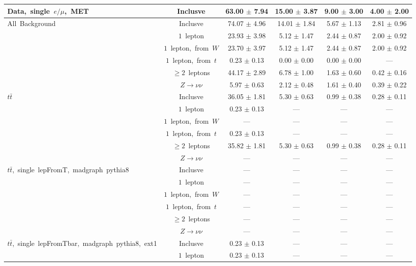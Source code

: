 \documentclass{article}
\begin{document}
\begin{longtable}{|l|c|c|c|c|c|}
\multirow{1}{*}{Data,~single~$e/\mu$,~MET} & Inclusve  & 63.00 $\pm$ 7.94  & 15.00 $\pm$ 3.87  & 9.00 $\pm$ 3.00  & 4.00 $\pm$ 2.00 \\* 
\hline \hline 
\multirow{6}{*}{All~Background} & Inclusve  & 74.07 $\pm$ 4.96  & 14.01 $\pm$ 1.84  & 5.67 $\pm$ 1.13  & 2.81 $\pm$ 0.96 \\* 
 & $1$~lepton  & 23.93 $\pm$ 3.98  & 5.12 $\pm$ 1.47  & 2.44 $\pm$ 0.87  & 2.00 $\pm$ 0.92 \\* 
 & $1$~lepton,~from~$W$  & 23.70 $\pm$ 3.97  & 5.12 $\pm$ 1.47  & 2.44 $\pm$ 0.87  & 2.00 $\pm$ 0.92 \\* 
 & $1$~lepton,~from~$t$  & 0.23 $\pm$ 0.13  & 0.00 $\pm$ 0.00  & 0.00 $\pm$ 0.00  & --- \\* 
 & $\ge2$~leptons  & 44.17 $\pm$ 2.89  & 6.78 $\pm$ 1.00  & 1.63 $\pm$ 0.60  & 0.42 $\pm$ 0.16 \\* 
 & $Z\rightarrow\nu\nu$  & 5.97 $\pm$ 0.63  & 2.12 $\pm$ 0.48  & 1.61 $\pm$ 0.40  & 0.39 $\pm$ 0.22 \\* 
\hline 
\multirow{6}{*}{$t\bar{t}$} & Inclusve  & 36.05 $\pm$ 1.81  & 5.30 $\pm$ 0.63  & 0.99 $\pm$ 0.38  & 0.28 $\pm$ 0.11 \\* 
 & $1$~lepton  & 0.23 $\pm$ 0.13  & ---  & ---  & --- \\* 
 & $1$~lepton,~from~$W$  & ---  & ---  & ---  & --- \\* 
 & $1$~lepton,~from~$t$  & 0.23 $\pm$ 0.13  & ---  & ---  & --- \\* 
 & $\ge2$~leptons  & 35.82 $\pm$ 1.81  & 5.30 $\pm$ 0.63  & 0.99 $\pm$ 0.38  & 0.28 $\pm$ 0.11 \\* 
 & $Z\rightarrow\nu\nu$  & ---  & ---  & ---  & --- \\* 
\hline 
\multirow{6}{*}{$t\bar{t}$,~single~lepFromT,~madgraph~pythia8} & Inclusve  & ---  & ---  & ---  & --- \\* 
 & $1$~lepton  & ---  & ---  & ---  & --- \\* 
 & $1$~lepton,~from~$W$  & ---  & ---  & ---  & --- \\* 
 & $1$~lepton,~from~$t$  & ---  & ---  & ---  & --- \\* 
 & $\ge2$~leptons  & ---  & ---  & ---  & --- \\* 
 & $Z\rightarrow\nu\nu$  & ---  & ---  & ---  & --- \\* 
\hline 
\multirow{6}{*}{$t\bar{t}$,~single~lepFromTbar,~madgraph~pythia8,~ext1} & Inclusve  & 0.23 $\pm$ 0.13  & ---  & ---  & --- \\* 
 & $1$~lepton  & 0.23 $\pm$ 0.13  & ---  & ---  & --- \\* 

\end{longtable}
\end{document}

